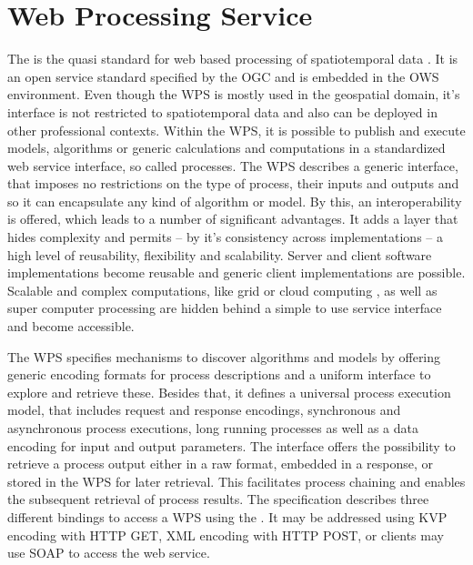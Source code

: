 \chapter{Web Processing Service}
  \label{sec:wps}
  The  is the quasi standard for web based processing of spatiotemporal data \citep{foerster2012live}. It is an open service standard specified by the \ac{OGC} and is embedded in the \ac{OWS} \citep{ogc:ows} environment. Even though the \ac{WPS} is mostly used in the geospatial domain, it's interface is not restricted to spatiotemporal data and also can be deployed in other professional contexts. Within the WPS, it is possible to publish and execute models, algorithms or generic calculations and computations in a standardized web service interface, so called processes. The \ac{WPS} describes a generic interface, that imposes no restrictions on the type of process, their inputs and outputs and so it can encapsulate any kind of algorithm or model. By this, an interoperability is offered, which leads to a number of significant advantages. It adds a layer that hides complexity and permits -- by it's consistency across implementations -- a high level of reusability, flexibility and scalability. Server and client software implementations become reusable and generic client implementations are possible. Scalable and complex computations, like grid \citep[e.g.][]{grid1,grid2,grid3} or cloud computing \citep[e.g.][]{cloud}, as well as super computer processing are hidden behind a simple to use service interface and become accessible.

  The \ac{WPS} specifies mechanisms to discover algorithms and models by offering generic encoding formats for process descriptions and a uniform interface to explore and retrieve these. Besides that, it defines a universal process execution model, that includes request and response encodings, synchronous and asynchronous process executions, long running processes as well as a data encoding for input and output parameters. The interface offers the possibility to retrieve a process output either in a raw format, embedded in a response, or stored in the \ac{WPS} for later retrieval. This facilitates process chaining and enables the subsequent retrieval of process results. The specification describes three different bindings to access a \ac{WPS} using the . It may be addressed using \ac{KVP} encoding with HTTP GET, XML encoding with HTTP POST, or clients may use SOAP \citep{w3c:soap1} to access the web service.

